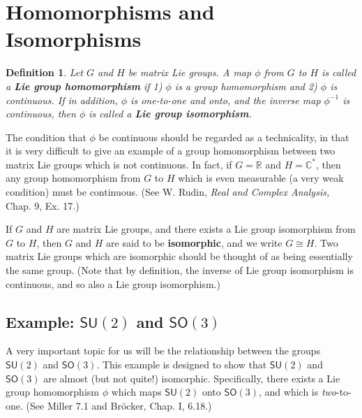 \documentclass[12pt]{amsbook}
\theoremstyle{plain}
\newtheorem{definition}[theorem]{Definition}
\numberwithin{equation}{chapter}
\numberwithin{theorem}{chapter}
\begin{document}
\section{Homomorphisms and Isomorphisms}

\begin{definition}
\label{matrix.homomorphism}Let $G$ and $H$ be matrix Lie groups. A map $\phi$
from $G$ to $H$ is called a \textbf{Lie group homomorphism} if 1) $\phi$ is a
group homomorphism and 2) $\phi$ is continuous. If in addition, $\phi$ is
one-to-one and onto, and the inverse map $\phi^{-1}$ is continuous, then
$\phi$ is called a \textbf{Lie group isomorphism}.
\end{definition}

The condition that $\phi$ be continuous should be regarded as a technicality,
in that it is very difficult to give an example of a group homomorphism
between two matrix Lie groups which is not continuous. In fact, if
$G=\mathbb{R}$ and $H=\mathbb{C}^{\ast}$, then any group homomorphism from $G$
to $H$ which is even measurable (a very weak condition) must be continuous.
(See W. Rudin, \textit{Real and Complex Analysis,} Chap. 9, Ex. 17.)

If $G$ and $H$ are matrix Lie groups, and there exists a Lie group isomorphism
from $G$ to $H$, then $G$ and $H$ are said to be \textbf{isomorphic}, and we
write $G\cong H$. Two matrix Lie groups which are isomorphic should be thought
of as being essentially the same group. (Note that by definition, the inverse
of Lie group isomorphism is continuous, and so also a Lie group isomorphism.)

\subsection{Example: $\mathsf{SU}(2)$ and $\mathsf{SO}(3)$}

A very important topic for us will be the relationship between the groups
$\mathsf{SU}(2)$ and $\mathsf{SO}(3)$. This example is designed to show that
$\mathsf{SU}(2)$ and $\mathsf{SO}(3)$ are almost (but not quite!) isomorphic.
Specifically, there exists a Lie group homomorphism $\phi$ which maps
$\mathsf{SU}(2)$ onto $\mathsf{SO}(3)$, and which is \textit{two}-to-one. (See
Miller 7.1 and Br\"ocker, Chap. I, 6.18.)
\end{document}
